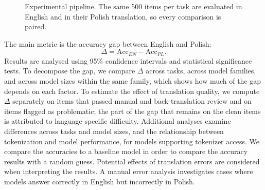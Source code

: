 \documentclass[11pt]{article}
\begin{document}
\begin{figure}[t]
\centering
{}
\caption{Experimental pipeline. The same 500 items per task are evaluated in English and in their Polish translation, so every comparison is paired.}
\label{fig:pipeline}
\end{figure}
The main metric is the accuracy gap between English and Polish:
\[
\Delta = \text{Acc}_{EN} - \text{Acc}_{PL}.
\]
Results are analysed using 95\% confidence intervals and statistical significance tests. To decompose the gap, we compare $\Delta$ across tasks, across model families,
and across model sizes within the same family, which shows how much of the gap
depends on each factor. To estimate the effect of translation quality, we
compute $\Delta$ separately on items that passed manual and back-translation
review and on items flagged as problematic; the part of the gap that remains
on the clean items is attributed to language-specific difficulty. Additional analyses examine differences across tasks and model sizes, and the relationship
between tokenization and model performance, for models supporting tokenizer access. We compare the accuracies to a baseline model in order to compare the accuracy results with a random guess.  Potential effects
of translation errors are considered when interpreting the results. A manual error analysis investigates cases where models answer correctly in English but incorrectly in Polish.
\end{document}
